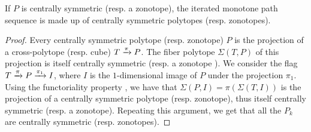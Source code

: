 \begin{lemma}
	\label{l:centrally-symmetric}
	If $P$ is centrally symmetric (resp. a zonotope), the iterated monotone path sequence is made up of centrally symmetric polytopes (resp. zonotopes). 
\end{lemma}

\begin{proof}
	Every centrally symmetric polytope (resp. zonotope) $P$ is the projection of a cross-polytope (resp. cube) $T \xrightarrow{\pi} P$.
	The fiber polytope $\Sigma(T,P)$ of this projection is itself centrally symmetric \cite[Theorem 5.1]{BilleraSturmfels92} (resp. a zonotope \cite[Theorem 4.1]{BilleraSturmfels92}).
	We consider the flag $T \xrightarrow{\pi} P \xrightarrow{\pi_1} I$, where $I$ is the $1$-dimensional image of $P$ under the projection $\pi_1$.
	Using the functoriality property \cite[Lemma 2.3]{BilleraSturmfels92}, we have that $\Sigma(P,I)=\pi(\Sigma(T,I))$ is the projection of a centrally symmetric polytope (resp. zonotope), thus itself centrally symmetric (resp. a zonotope).
	Repeating this argument, we get that all the $P_k$ are centrally symmetric (resp. zonotopes).
\end{proof}





